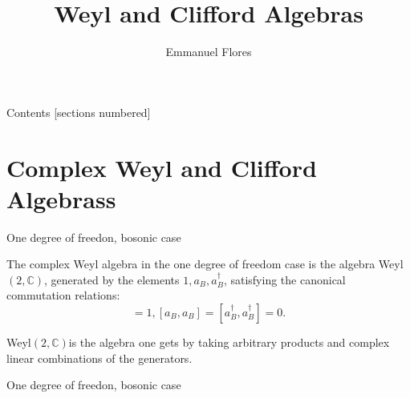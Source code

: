 \documentclass[12pt]{beamer}
\title{Weyl and Clifford Algebras}
\author{Emmanuel Flores}
\institute{Advanced Mathematical Methods, \\Tufts University}
\begin{document}
\maketitle
\begin{frame}{Contents}
	[sections numbered]
	\tableofcontents
\end{frame}
\section[Complex Weyl and Clifford Algebrass]{Complex Weyl and Clifford Algebrass}
\begin{frame}{One degree of freedon, bosonic case}
\begin{definition}
	The complex Weyl algebra in the one degree of freedom case is the algebra Weyl$(2, \mathbb{C})$, generated by the elements $1, a_{B}, a_{B}^{\dagger}$, satisfying the canonical commutation relations:
\begin{displaymath}
  [a_{B}, a_{B}^{\dagger}] = 1, [a_{B}, a_{B}] = [a_{B}^{\dagger}, a_{B}^{\dagger}]=0.
\end{displaymath}
\end{definition}
Weyl$(2, \mathbb{C})$is the algebra one gets by taking arbitrary products and complex linear combinations of the generators.
\end{frame}

\begin{frame}{One degree of freedon, bosonic case}
	
\end{frame}
\end{document}
